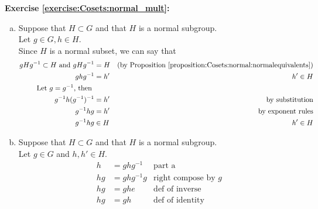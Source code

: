 \noindent\textbf{Exercise \ref{exercise:Cosets:normal_mult}:}
\begin{enumerate}[(a)]
\item
Suppose that $H \subset G$ and that $H$ is a normal subgroup.  
\\
Let $g \in G, h \in H$.
\\
Since $H$ is a normal subset, we can say that 
\begin{align*}
gHg^{-1} \subset H \text{\ and\ } gHg^{-1} &= H &\text{(by Proposition~\ref{proposition:Cosets:normal:normalequivalents})}
\\
ghg^{-1} &= h' &h' \in H
\\
\text{Let\ } g = g^{-1}\text{, then\ } 
\\
g^{-1}h(g^{-1})^{-1} &= h' &\text{by substitution}
\\
g^{-1}hg &= h' &\text{by exponent rules}
\\
g^{-1}hg &\in H &h' \in H 
\end{align*}

\item
Suppose that $H \subset G$ and that $H$ is a normal subgroup.  
\\
Let $g \in G$ and $h, h' \in H$.
\\
\begin{align*}
h &= ghg^{-1} &\text{part a}
\\
hg &= ghg^{-1}g &\text{right compose by\ } g
\\
hg &= ghe &\text{def of inverse}
\\
hg &= gh &\text{def of identity}
\end{align*}


\end{enumerate}
